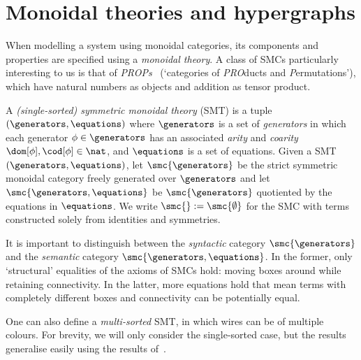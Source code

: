 \section{Monoidal theories and hypergraphs}

When modelling a system using monoidal categories, its components and
properties are specified using a \emph{monoidal theory}.
A class of SMCs particularly interesting to us is that of
\emph{PROPs}~\cite{maclane1965categorical} (`categories of \emph{PRO}ducts and
\emph{P}ermutations'), which have natural numbers as objects and addition as
tensor product.

\begin{definition}
    A \emph{(single-sorted) symmetric monoidal theory} (SMT) is a tuple \(
        (\generators,\equations)
    \) where \(\generators\) is a set of \emph{generators} in which each
    generator \(\phi \in \generators\) has an associated \emph{arity} and
    \emph{coarity} \(\dom[\phi], \cod[\phi] \in \nat\), and \(\equations\) is a
    set of equations.
    Given a SMT \((\generators,\equations)\), let \(
        \smc{\generators}
    \) be the strict symmetric monoidal category freely generated over
    \(\generators\) and let \(\smc{\generators,\equations}\) be
    \(\smc{\generators}\) quotiented by the equations in \(\equations\).
    We write \(\smc{} := \smc{\emptyset}\) for the SMC with terms constructed
    solely from identities and symmetries.
\end{definition}

It is important to distinguish between the \emph{syntactic} category
\(\smc{\generators}\) and the \emph{semantic} category
\(\smc{\generators,\equations}\).
In the former, only `structural' equalities of the axioms of SMCs hold:
moving boxes around while retaining connectivity.
In the latter, more equations hold that mean terms with completely different
boxes and connectivity can be potentially equal.

\begin{remark}
    One can also define a \emph{multi-sorted} SMT, in which wires can be of
    multiple colours.
    For brevity, we will only consider the single-sorted case, but the results
    generalise easily using the results
    of~\cite{bonchi2022string,bonchi2022stringa}.
\end{remark}





